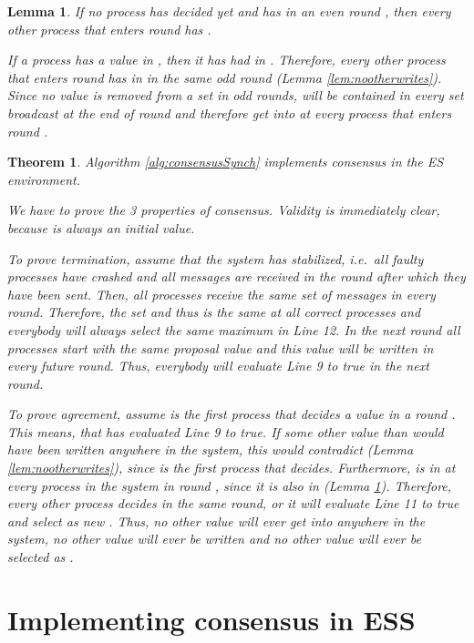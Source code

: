 \documentclass[conference, compsoc]{IEEEtran}
\newtheorem{lemma}{Lemma}
\newtheorem{theorem}{Theorem}
\begin{document}
\begin{lemma}
 \label{lem:writeeverywhere}
 If no process has decided yet and  has  in an even round , then every other process  that enters round  has .
 \begin{IEEEproof}
 If a process  has a value  in , then it has had  in . Therefore, every other process  that enters round  has  in  in the same odd round  (Lemma \ref{lem:nootherwrites}). Since no value is removed from a set  in odd rounds,  will be contained in every set  broadcast at the end of round  and therefore get into  at every process  that enters round .   
 \end{IEEEproof}
\end{lemma}


\begin{theorem}
Algorithm \ref{alg:consensusSynch} implements consensus in the ES environment.
\begin{IEEEproof} 
We have to prove the 3 properties of consensus. Validity is immediately clear, because  is always an initial value.

To prove termination, assume that the system has stabilized, i.e.~all faulty processes have crashed and all messages are received in the round after which they have been sent. Then, all processes receive the same set of messages in every round. Therefore, the set  and thus  is the same at all correct processes and everybody will always select the same maximum in Line 12. In the next round all processes start with the same proposal value and this value will be written in every future round. Thus, everybody will evaluate Line 9 to true in the next round.    

To prove agreement, assume  is the first process that decides a value  in a round . This means, that  has evaluated Line 9 to true. If some other value than  would have been written anywhere in the system, this would contradict  (Lemma \ref{lem:nootherwrites}), since  is the first process that decides. Furthermore,  is in  at every process in the system in round , since it is also in  (Lemma \ref{lem:writeeverywhere}). Therefore, every other process decides  in the same round, or it will evaluate Line 11 to true and select  as new . Thus, no other value will ever get into  anywhere in the system, no other value will ever be written and no other value will ever be selected as .

\end{IEEEproof}
\end{theorem}

\section{Implementing consensus in ESS} \label{sec:ConsESS}
\end{document}
